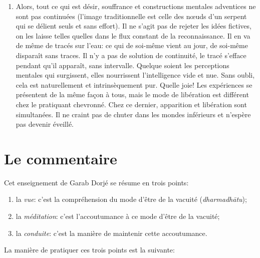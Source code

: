 \documentclass[a4paper]{article}
\begin{document}
\begin{enumerate}
  \item Alors, tout ce qui est désir, souffrance et constructions
        mentales adventices ne sont pas continuées (l'image
        traditionnelle est celle des n{\oe}uds d'un serpent qui se
        délient seuls et sans effort). Il ne s'agit pas de rejeter les
        idées fictives, on les laisse telles quelles dans le flux
        constant de la reconnaissance. Il en va de même de tracés sur
        l'eau: ce qui de soi-même vient au jour, de soi-même disparaît
        sans traces. Il n'y a pas de solution de continuité, le tracé
        s'efface pendant qu'il apparaît, sans intervalle. Quelque
        soient les perceptions mentales qui surgissent, elles
        nourrissent l'intelligence vide et nue. Sans oubli, cela est
        naturellement et intrinsèquement pur. Quelle joie! Les
        expériences se présentent de la même façon à tous, mais le
        mode de libération est différent chez le pratiquant
        chevronné. Chez ce dernier, apparition et libération sont
        simultanées. Il ne craint pas de chuter dans les mondes
        inférieurs et n'espère pas devenir éveillé.

\end{enumerate}


\section{Le commentaire}

\noindent
Cet enseignement de Garab Dorjé se résume en trois points:

\begin{enumerate}

  \item la \emph{vue}: c'est la compréhension du mode d'être de la
        vacuité (\emph{dharmadh\={a}\-tu});

  \item la \emph{méditation}: c'est l'accoutumance à ce mode d'être de
        la vacuité;

  \item la \emph{conduite}: c'est la manière de maintenir cette
        accoutumance.

\end{enumerate}

\noindent
La manière de pratiquer ces trois points est la suivante:
\end{document}

